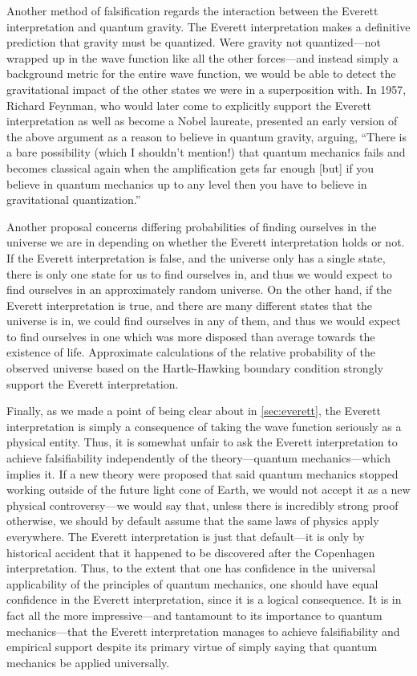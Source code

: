 \documentclass[
    12pt,
    letterpaper,
    aps,
    prd,
    longbibliography,
    twocolumn,
    nofootinbib,
    raggedbottom,
    amsmath,
    amssymb,
    amsfonts,
]{revtex4-1}
\begin{document}
Another method of falsification regards the interaction between the Everett interpretation and quantum gravity. The Everett interpretation makes a definitive prediction that gravity must be quantized. Were gravity not quantized---not wrapped up in the wave function like all the other forces---and instead simply a background metric for the entire wave function, we would be able to detect the gravitational impact of the other states we were in a superposition with.\cite{falsification}\cite{hartle} In 1957, Richard Feynman, who would later come to explicitly support the Everett interpretation\cite{faq} as well as become a Nobel laureate, presented an early version of the above argument as a reason to believe in quantum gravity, arguing, ``There is a bare possibility (which I shouldn't mention!) that quantum mechanics fails and becomes classical again when the amplification gets far enough [but] if you believe in quantum mechanics up to any level then you have to believe in gravitational quantization.''\cite{feynman}

Another proposal concerns differing probabilities of finding ourselves in the universe we are in depending on whether the Everett interpretation holds or not. If the Everett interpretation is false, and the universe only has a single state, there is only one state for us to find ourselves in, and thus we would expect to find ourselves in an approximately random universe. On the other hand, if the Everett interpretation is true, and there are many different states that the universe is in, we could find ourselves in any of them, and thus we would expect to find ourselves in one which was more disposed than average towards the existence of life. Approximate calculations of the relative probability of the observed universe based on the Hartle-Hawking boundary condition strongly support the Everett interpretation.\cite{falsification}

Finally, as we made a point of being clear about in \autoref{sec:everett}, the Everett interpretation is simply a consequence of taking the wave function seriously as a physical entity. Thus, it is somewhat unfair to ask the Everett interpretation to achieve falsifiability independently of the theory---quantum mechanics---which implies it.\cite{carolltestable} If a new theory were proposed that said quantum mechanics stopped working outside of the future light cone of Earth, we would not accept it as a new physical controversy---we would say that, unless there is incredibly strong proof otherwise, we should by default assume that the same laws of physics apply everywhere. The Everett interpretation is just that default---it is only by historical accident that it happened to be discovered after the Copenhagen interpretation. Thus, to the extent that one has confidence in the universal applicability of the principles of quantum mechanics, one should have equal confidence in the Everett interpretation, since it is a logical consequence. It is in fact all the more impressive---and tantamount to its importance to quantum mechanics---that the Everett interpretation manages to achieve falsifiability and empirical support despite its primary virtue of simply saying that quantum mechanics be applied universally.
\end{document}
